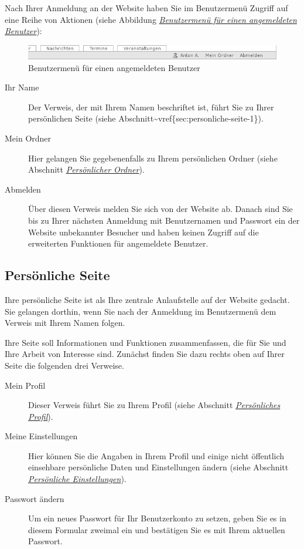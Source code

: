 \documentclass[a4paper,12pt,ngerman]{manual}
\begin{document}
Nach Ihrer Anmeldung an der Website haben Sie im Benutzermenü Zugriff auf eine
Reihe von Aktionen (siehe Abbildung \hyperlink{fig-benutzermenue}{\emph{Benutzermenü für einen angemeldeten Benutzer}}):
\hypertarget{fig-benutzermenue}{}\begin{figure}[htbp]
\centering

\includegraphics{benutzermenue.png}
\caption{Benutzermenü für einen angemeldeten Benutzer}\end{figure}
\begin{description}
\item[Ihr Name] \leavevmode
Der Verweis, der mit Ihrem Namen beschriftet ist, führt Sie zu
Ihrer persönlichen Seite (siehe Abschnitt\textasciitilde{}vref\{sec:personliche-seite-1\}).

\item[Mein Ordner] \leavevmode
Hier gelangen Sie gegebenenfalls zu Ihrem persönlichen
Ordner (siehe Abschnitt \hyperlink{sec-mitgliedsordner}{\emph{Persönlicher Ordner}}).

\item[Abmelden] \leavevmode
Über diesen Verweis melden Sie sich von der Website ab. Danach
sind Sie bis zu Ihrer nächsten Anmeldung mit Benutzernamen und Passwort ein
der Website unbekannter Besucher und haben keinen Zugriff auf die
erweiterten Funktionen für angemeldete Benutzer.

\end{description}
\hypertarget{sec-personliche-seite-1}{}

\subsection{Persönliche Seite}

Ihre persönliche Seite ist als Ihre zentrale Anlaufstelle auf der
Website gedacht. Sie gelangen dorthin, wenn Sie nach der Anmeldung im
Benutzermenü dem Verweis mit Ihrem Namen folgen.

Ihre Seite soll Informationen und Funktionen zusammenfassen, die für Sie und
Ihre Arbeit von Interesse sind. Zunächst finden Sie dazu rechts oben auf Ihrer
Seite die folgenden drei Verweise.
\begin{description}
\item[Mein Profil] \leavevmode
Dieser Verweis führt Sie zu Ihrem Profil (siehe
Abschnitt \hyperlink{sec-profil}{\emph{Persönliches Profil}}).

\item[Meine Einstellungen] \leavevmode
Hier können Sie die Angaben in Ihrem Profil und einige
nicht öffentlich einsehbare persönliche Daten und Einstellungen ändern
(siehe Abschnitt \hyperlink{sec-persoenliche-einstellungen}{\emph{Persönliche Einstellungen}}).

\item[Passwort ändern] \leavevmode
Um ein neues Passwort für Ihr Benutzerkonto zu setzen,
geben Sie es in diesem Formular zweimal ein und bestätigen Sie es mit Ihrem
aktuellen Passwort.

\end{description}
\end{document}

